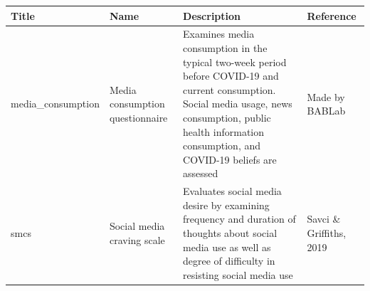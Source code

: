 \documentclass[]{book}
\begin{document}
\begin{longtable}[]{@{}llll@{}}
\toprule
\begin{minipage}[b]{0.22\columnwidth}\raggedright
Title\strut
\end{minipage} & \begin{minipage}[b]{0.27\columnwidth}\raggedright
Name\strut
\end{minipage} & \begin{minipage}[b]{0.22\columnwidth}\raggedright
Description\strut
\end{minipage} & \begin{minipage}[b]{0.18\columnwidth}\raggedright
Reference\strut
\end{minipage}\tabularnewline
\midrule
\endhead
\begin{minipage}[t]{0.22\columnwidth}\raggedright
media\_consumption\strut
\end{minipage} & \begin{minipage}[t]{0.27\columnwidth}\raggedright
Media consumption questionnaire\strut
\end{minipage} & \begin{minipage}[t]{0.22\columnwidth}\raggedright
Examines media consumption in the typical two-week period before COVID-19 and current consumption. Social media usage, news consumption, public health information consumption, and COVID-19 beliefs are assessed\strut
\end{minipage} & \begin{minipage}[t]{0.18\columnwidth}\raggedright
Made by BABLab\strut
\end{minipage}\tabularnewline
\begin{minipage}[t]{0.22\columnwidth}\raggedright
smcs\strut
\end{minipage} & \begin{minipage}[t]{0.27\columnwidth}\raggedright
Social media craving scale\strut
\end{minipage} & \begin{minipage}[t]{0.22\columnwidth}\raggedright
Evaluates social media desire by examining frequency and duration of thoughts about social media use as well as degree of difficulty in resisting social media use\strut
\end{minipage} & \begin{minipage}[t]{0.18\columnwidth}\raggedright
Savci \& Griffiths, 2019\strut
\end{minipage}\tabularnewline
\bottomrule
\end{longtable}
\end{document}
